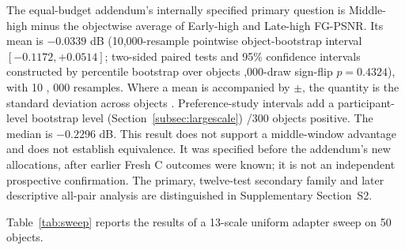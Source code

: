 \documentclass[times,twocolumn,final]{elsarticle}
\providecommand{\DIFadd}[1]{{\protect\color{blue} \sf #1}} %
\providecommand{\DIFdel}[1]{{\protect\color{red} \scriptsize #1}} %
\providecommand{\DIFaddbegin}{} %
\providecommand{\DIFaddend}{} %
\providecommand{\DIFdelbegin}{} %
\providecommand{\DIFdelend}{} %
\begin{document}
\DIFadd{The equal-budget addendum's internally specified primary question is Middle-high minus the objectwise average of Early-high and Late-high FG-PSNR. Its mean is $-0.0339$ dB (10,000-resample pointwise object-bootstrap interval $[-0.1172,+0.0514]$; }\DIFaddend two-sided \DIFdelbegin \DIFdel{paired tests and 95\% confidence intervals constructed by percentile bootstrap over objects}\DIFdelend \DIFaddbegin \DIFadd{20,000-draw sign-flip $p=0.4324$), }\DIFaddend with \DIFdelbegin \DIFdel{10}%
\DIFdel{, }%
\DIFdel{000 resamples. Where a mean is accompanied by $\pm$, the quantity is the standard deviation across objects . Preference-study intervals add a participant-level bootstrap level (Section~\ref{subsec:largescale})}\DIFdelend \DIFaddbegin \DIFadd{119/300 objects positive. The median is $-0.2296$ dB. This result does not support a middle-window advantage and does not establish equivalence. It was specified before the addendum's new allocations, after earlier Fresh C outcomes were known; it is not an independent prospective confirmation. The primary, twelve-test secondary family and later descriptive all-pair analysis are distinguished in Supplementary Section~S2}\DIFaddend .

\DIFdelbegin %

\DIFdel{Table~\ref{tab:sweep} reports the results of a 13-scale uniform adapter sweep on 50 objects. }%
\end{document}
